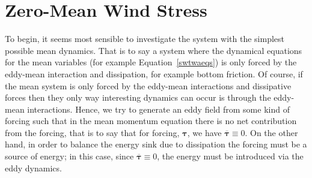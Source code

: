 \documentclass[12pt,a4paper]{report}
\newcommand*\thkmean[1]{\overline{#1}}
\newcommand*\equref[1]{Equation~\eqref{#1}}
\begin{document}



\section{Zero-Mean Wind Stress}

\label{stochwind}

To begin, it seems most sensible to investigate the 
system with the simplest possible mean dynamics.
That is to say a system where the dynamical equations 
for the mean variables (for example \equref{swtwaeqs}) is 
only forced by the eddy-mean interaction and dissipation,
for example bottom friction. Of course, if the mean system is
only forced by the eddy-mean interactions and dissipative forces
then they only way interesting dynamics can occur
is through the eddy-mean interactions. Hence, we try to
generate an eddy field from some kind of forcing such that in the mean 
momentum equation there is no net contribution from the forcing, that is to say
that for forcing, $\boldsymbol{\tau}$, we have $\thkmean{\boldsymbol{\tau}}\equiv0$.
On the other hand, in order to balance the energy sink due to dissipation the forcing
must be a source of energy; in this case, since $\thkmean{\boldsymbol{\tau}}\equiv0$,
the energy must be introduced via the eddy dynamics.
\end{document}

